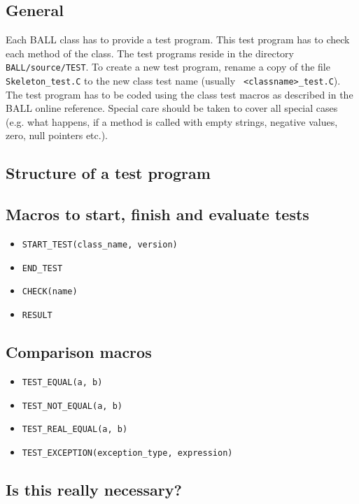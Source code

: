 \documentclass[a4]{article}
\begin{document}
\subsection{General}

Each BALL class has to provide a test program. This test program has to check
each method of the class. The test programs reside in the directory
{\tt BALL/source/TEST}. To create a new test program, rename a copy of the file
{\tt Skeleton\_test.C} to the new class test name (usually {\tt
<classname>\_test.C}). The test program has to be coded using the class test
macros as described in the BALL online reference. Special care should be taken
to cover all special cases (e.g. what happens, if a method is called with
empty strings, negative values, zero, null pointers etc.).


\subsection{Structure of a test program}

\subsection{Macros to start, finish and evaluate tests}
\begin{itemize}
	\item {\tt START\_TEST(class\_name, version)}
	\item {\tt END\_TEST}
	\item {\tt CHECK(name)}
	\item {\tt RESULT}
\end{itemize}

\subsection{Comparison macros}
\begin{itemize}
	\item {\tt TEST\_EQUAL(a, b)}
	\item {\tt TEST\_NOT\_EQUAL(a, b)}
	\item {\tt TEST\_REAL\_EQUAL(a, b)}
	\item {\tt TEST\_EXCEPTION(exception\_type, expression)}	
\end{itemize}

\subsection{Is this really necessary?}
\end{document}
